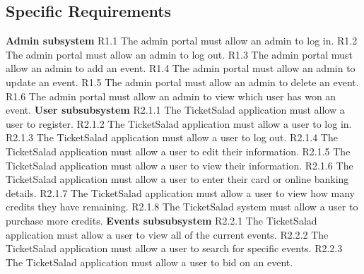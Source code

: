\documentclass[11pt]{article}
\begin{document}
	\subsection{Specific Requirements}
	\textbf{Admin subsystem}
	\newline
	R1.1 The admin portal must allow an admin to log in.
	\newline
	R1.2 The admin portal must allow an admin to log out.
	\newline
	R1.3 The admin portal must allow an admin to add an event.
	\newline
	R1.4 The admin portal must allow an admin to update an event.
	\newline
	R1.5 The admin portal must allow an admin to delete an event.
	\newline
	R1.6 The admin portal must allow an admin to view which user has won an event.
	\newline
	\newline
	\textbf{User subsubsystem}
	\newline
	R2.1.1 The TicketSalad application must allow a user to register.
	\newline
	R2.1.2 The TicketSalad application must allow a user to log in.
	\newline
	R2.1.3 The TicketSalad application must allow a user to log out.
	\newline
	R2.1.4 The TicketSalad application must allow a user to edit their information.
	\newline
	R2.1.5 The TicketSalad application must allow a user to view their information.
	\newline
	R2.1.6 The TicketSalad application must allow a user to enter their card or online banking details.
	\newline 
	R2.1.7 The TicketSalad application must allow a user to view how many credits they have remaining.
	\newline
	R2.1.8 The TicketSalad system must allow a user to purchase more credits.
	\newline
	\newline
	\textbf{Events subsubsystem}
	\newline
	R2.2.1 The TicketSalad application must allow a user to view all of the current events.
	\newline
	R2.2.2 The TicketSalad application must allow a user to search for specific events.
	\newline
	R2.2.3 The TicketSalad application must allow a user to bid on an event.
	\newline 
\end{document}
